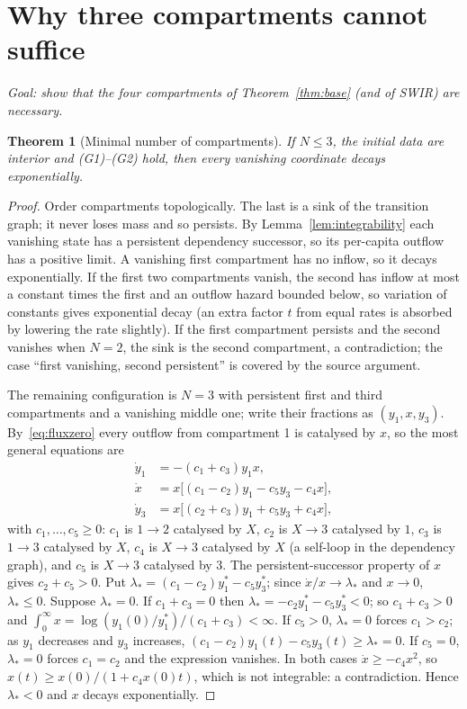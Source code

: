 \documentclass[11pt,a4paper]{article}
\newtheorem{theorem}{Theorem}[section]
\theoremstyle{definition}\newtheorem{definition}[theorem]{Definition}
\theoremstyle{remark}\newtheorem{remark}[theorem]{Remark}
\begin{document}
\section{Why three compartments cannot suffice}
\label{sec:minimality}

\emph{Goal: show that the four compartments of Theorem~\ref{thm:base}
(and of SWIR) are necessary.}

\begin{theorem}[Minimal number of compartments]
\label{thm:minimal}
If $N\le3$, the initial data are interior and (G1)--(G2) hold, then
every vanishing coordinate decays exponentially.
\end{theorem}
\begin{proof}
Order compartments topologically. The last is a sink of the transition
graph; it never loses mass and so persists. By
Lemma~\ref{lem:integrability} each vanishing state has a persistent
dependency successor, so its per-capita outflow has a positive limit. A
vanishing first compartment has no inflow, so it decays exponentially.
If the first two compartments vanish, the second has inflow at most a
constant times the first and an outflow hazard bounded below, so
variation of constants gives exponential decay (an extra factor $t$
from equal rates is absorbed by lowering the rate slightly). If the
first compartment persists and the second vanishes when $N=2$, the
sink is the second compartment, a contradiction; the case ``first
vanishing, second persistent'' is covered by the source argument.

The remaining configuration is $N=3$ with persistent first and third
compartments and a vanishing middle one; write their fractions as
$(y_1,x,y_3)$. By~\eqref{eq:fluxzero} every outflow from compartment 1
is catalysed by $x$, so the most general equations are
\begin{align*}
\dot y_1&=-(c_1+c_3)y_1x,\\
\dot x&=x\bigl[(c_1-c_2)y_1-c_5y_3-c_4x\bigr],\\
\dot y_3&=x\bigl[(c_2+c_3)y_1+c_5y_3+c_4x\bigr],
\end{align*}
with $c_1,\dots,c_5\ge0$: $c_1$ is $1\to2$ catalysed by $X$, $c_2$ is
$X\to3$ catalysed by $1$, $c_3$ is $1\to3$ catalysed by $X$, $c_4$ is
$X\to3$ catalysed by $X$ (a self-loop in the dependency graph), and
$c_5$ is $X\to3$ catalysed by $3$. The persistent-successor property of
$x$ gives $c_2+c_5>0$. Put $\lambda_*=(c_1-c_2)y_1^*-c_5y_3^*$; since
$\dot x/x\to\lambda_*$ and $x\to0$, $\lambda_*\le0$. Suppose
$\lambda_*=0$. If $c_1+c_3=0$ then $\lambda_*=-c_2y_1^*-c_5y_3^*<0$;
so $c_1+c_3>0$ and
$\int_0^\infty x=\log(y_1(0)/y_1^*)/(c_1+c_3)<\infty$. If $c_5>0$,
$\lambda_*=0$ forces $c_1>c_2$; as $y_1$ decreases and $y_3$ increases,
$(c_1-c_2)y_1(t)-c_5y_3(t)\ge\lambda_*=0$. If $c_5=0$, $\lambda_*=0$
forces $c_1=c_2$ and the expression vanishes. In both cases
$\dot x\ge-c_4x^2$, so $x(t)\ge x(0)/(1+c_4x(0)t)$, which is not
integrable: a contradiction. Hence $\lambda_*<0$ and $x$ decays
exponentially.
\end{proof}
\end{document}
